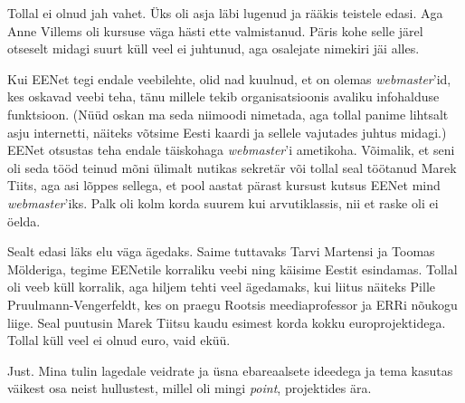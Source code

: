 
Tollal ei olnud jah vahet. Üks oli asja läbi lugenud ja rääkis teistele 
edasi. Aga Anne Villems oli kursuse väga hästi ette valmistanud. Päris kohe selle järel otseselt midagi suurt küll veel ei juhtunud, aga osalejate nimekiri jäi alles. 

Kui EENet tegi endale veebilehte, olid nad kuulnud, et on olemas
\emph{webmaster}'id, kes oskavad veebi teha, tänu millele tekib organisatsioonis 
avaliku infohalduse funktsioon. (Nüüd oskan ma seda niimoodi nimetada, aga 
tollal panime lihtsalt asju internetti, näiteks 
võtsime Eesti kaardi ja sellele vajutades juhtus midagi.) EENet otsustas teha endale täiskohaga \emph{webmaster}'i ametikoha. Võimalik, et seni oli seda tööd teinud mõni ülimalt nutikas 
sekretär või tollal seal töötanud Marek 
Tiits, aga 
asi lõppes sellega, et pool aastat pärast kursust kutsus EENet mind
\emph{webmaster}'iks. Palk oli kolm korda suurem kui arvutiklassis, nii et raske oli ei öelda.

Sealt edasi läks elu väga ägedaks. Saime tuttavaks Tarvi 
Martensi ja Toomas 
Mölderiga, tegime EENetile korraliku veebi ning käisime Eestit esindamas. Tollal oli veeb küll korralik, 
aga hiljem tehti veel ägedamaks, kui liitus näiteks Pille 
Pruulmann-Vengerfeldt, kes on praegu
Rootsis meediaprofessor ja 
ERRi nõukogu 
liige. Seal puutusin Marek Tiitsu kaudu esimest 
korda kokku europrojektidega. Tollal küll veel ei olnud euro, vaid eküü. 


Just. Mina tulin lagedale veidrate ja üsna ebareaalsete
ideedega ja tema kasutas väikest osa neist hullustest, millel oli mingi \emph{point}, projektides ära.



